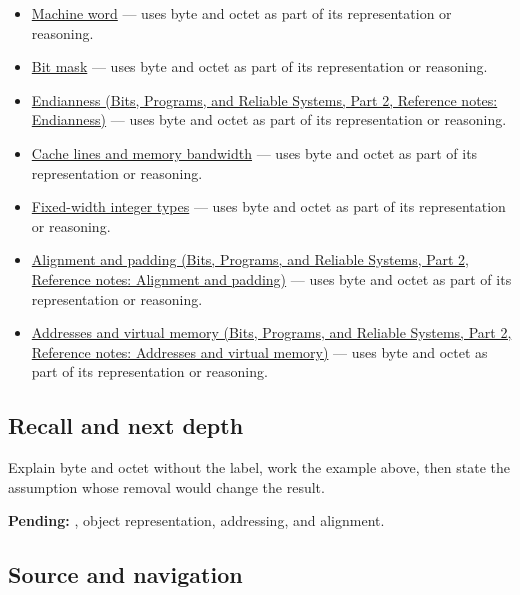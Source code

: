 \hypertarget{appendix-5bee2df85484-used-by}{}

\begin{itemize}
\tightlist
\item
  \hyperref[appendix-d67a19507dc5]{Machine word} --- uses byte and octet as part of its representation or reasoning.
\item
  \hyperref[appendix-dbe5905163c2]{Bit mask} --- uses byte and octet as part of its representation or reasoning.
\item
  \href{../01-Bits-Programs-and-Reliable-Systems-P02/main.pdf\#nameddest=appendix-bc07c3d25b18}{Endianness (Bits, Programs, and Reliable Systems, Part 2, Reference notes: Endianness)} --- uses byte and octet as part of its representation or reasoning.
\item
  \hyperref[appendix-e4ccdbab8320]{Cache lines and memory bandwidth} --- uses byte and octet as part of its representation or reasoning.
\item
  \hyperref[appendix-cc04044b5782]{Fixed-width integer types} --- uses byte and octet as part of its representation or reasoning.
\item
  \href{../01-Bits-Programs-and-Reliable-Systems-P02/main.pdf\#nameddest=appendix-a1f7c53b4742}{Alignment and padding (Bits, Programs, and Reliable Systems, Part 2, Reference notes: Alignment and padding)} --- uses byte and octet as part of its representation or reasoning.
\item
  \href{../01-Bits-Programs-and-Reliable-Systems-P02/main.pdf\#nameddest=appendix-18ee4f913c3c}{Addresses and virtual memory (Bits, Programs, and Reliable Systems, Part 2, Reference notes: Addresses and virtual memory)} --- uses byte and octet as part of its representation or reasoning.
\end{itemize}

\subsection{Recall and next depth}\label{appendix-5bee2df85484-recall-and-next-depth}

\hypertarget{appendix-5bee2df85484-recall-and-next-depth}{}

Explain byte and octet without the label, work the example above, then state the assumption whose removal would change the result.

\textbf{Pending:} , object representation, addressing, and alignment.

\subsection{Source and navigation}\label{appendix-5bee2df85484-source-and-navigation}

